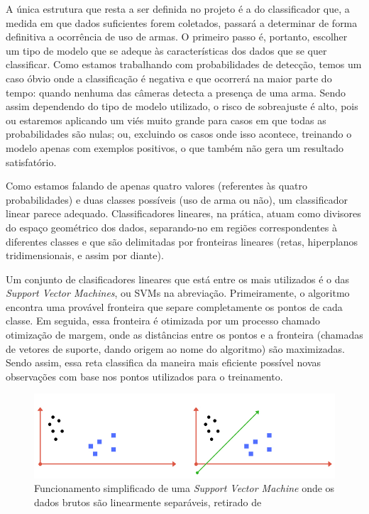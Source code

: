 \documentclass[]{politex}
\begin{document}
A única estrutura que resta a ser definida no projeto é a do classificador que, a medida em que dados suficientes forem coletados, passará a determinar de forma definitiva a ocorrência de uso de armas. O primeiro passo é, portanto, escolher um tipo de modelo que se adeque às características dos dados que se quer classificar. Como estamos trabalhando com probabilidades de detecção, temos um caso óbvio onde a classificação é negativa e que ocorrerá na maior parte do tempo: quando nenhuma das câmeras detecta a presença de uma arma. Sendo assim dependendo do tipo de modelo utilizado, o risco de sobreajuste é alto, pois ou estaremos aplicando um viés muito grande para casos em que todas as probabilidades são nulas; ou, excluindo os casos onde isso acontece, treinando o modelo apenas com exemplos positivos, o que também não gera um resultado satisfatório.

Como estamos falando de apenas quatro valores (referentes às quatro probabilidades) e duas classes possíveis (uso de arma ou não), um classificador linear parece adequado. Classificadores lineares, na prática, atuam como divisores do espaço geométrico dos dados, separando-no em regiões correspondentes à diferentes classes e que são delimitadas por fronteiras lineares (retas, hiperplanos tridimensionais, e assim por diante).

Um conjunto de clasificadores lineares que está entre os mais utilizados é o das \textit{Support Vector Machines}, ou SVMs na abreviação. Primeiramente, o algoritmo encontra uma provável fronteira que separe completamente os pontos de cada classe. Em seguida, essa fronteira é otimizada por um processo chamado otimização de margem, onde as distâncias entre os pontos e a fronteira (chamadas de vetores de suporte, dando origem ao nome do algoritmo) são maximizadas. Sendo assim, essa reta classifica da maneira mais eficiente possível novas observações com base nos pontos utilizados para o treinamento.

\begin{figure}[ht]
  \centering
  \includegraphics[scale=0.6]{img/svmlinear.jpg}
  \caption{Funcionamento simplificado de uma \textit{Support Vector Machine} onde os dados brutos são linearmente separáveis, retirado de \citeyear{svmimagens} \citeauthor{svmimagens}}
  \label{fig:svmlinear}
\end{figure}
\end{document}
